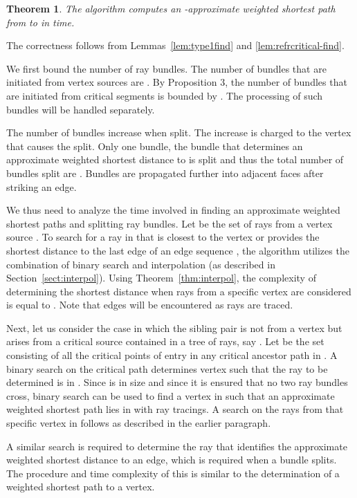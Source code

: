\documentclass[11pt]{article}
\newtheorem{theorem}{Theorem}[section]
\newenvironment{proof}{\par\noindent{\bf Proof:}}{\mbox{}\hfill\\}
\begin{document}
\begin{theorem}
\label{thm:timecompl} 
The algorithm computes an -approximate weighted shortest path from  to  in 
 time. 
\end{theorem}

\begin{proof}
The correctness follows from Lemmas~\ref{lem:type1find} and \ref{lem:refrcritical-find}.

We first bound the number of ray bundles.
The number of bundles that are initiated from vertex sources are . 
By Proposition 3, the number of bundles that are initiated from critical segments is bounded by .
The processing of such bundles will be handled separately.

The number of bundles increase when split. 
The increase is charged to the vertex  that causes the split. 
Only one bundle, the bundle that determines an approximate weighted shortest distance to  is split and thus the total number of bundles split are .
Bundles are propagated further into adjacent faces after striking an edge.

We thus need to analyze the time involved in finding an approximate weighted shortest paths and splitting ray bundles.
Let  be the set of rays from a vertex source .
To search for  a  ray in  that is closest to the vertex or provides the shortest distance to the last edge  of an edge sequence , the algorithm utilizes the combination of binary search and interpolation (as described in Section~\ref{sect:interpol}).
Using Theorem~\ref{thm:interpol}, the complexity of determining the shortest distance  when  rays from a specific vertex are considered
is equal to .
Note that  edges will be encountered as rays are traced.


Next, let us consider the  case in which the sibling pair is not from a vertex but arises from a  critical source
contained in a tree of rays, say .
Let  be the set consisting of all the critical points of entry in any critical ancestor path  in .
A binary search on the critical path determines vertex  such that the ray to be determined is in .
Since  is  in size and since it is ensured that no two ray bundles cross, binary search can be used to find a vertex   in  such that an approximate weighted shortest path lies in  with  ray tracings.
A search on the rays from that specific vertex in  follows as described in the earlier paragraph. 

A similar search is required to determine the ray that identifies the approximate weighted shortest distance to an edge, which is required when a bundle splits.
The procedure and time complexity of this is similar to the determination of a weighted shortest path to a vertex. 


\end{proof}
\end{document}
